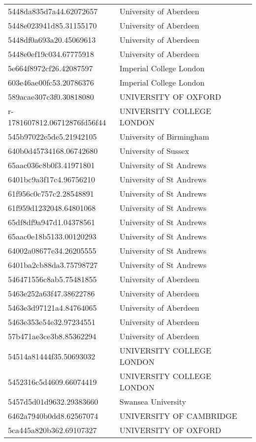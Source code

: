 \begin{tabular}{ll}
5448da835d7a44.62072657 & University of Aberdeen \\
5448e023941d85.31155170 & University of Aberdeen \\
5448df0a693a20.45069613 & University of Aberdeen \\
5448e0ef19c034.67775918 & University of Aberdeen \\
5e664f8972cf26.42087597 & Imperial College London \\
603e46ae00fc53.20786376 & Imperial College London \\
589acae307c3f0.30818080 & UNIVERSITY OF OXFORD \\
r-1781607812.06712876fd56f44 & UNIVERSITY COLLEGE LONDON \\
545b97022e5de5.21942105 & University of Birmingham \\
640b0d45734168.06742680 & University of Sussex \\
65aac036c8b0f3.41971801 & University of St Andrews \\
6401bc9a3f17c4.96756210 & University of St Andrews \\
61f956c0c757c2.28548891 & University of St Andrews \\
61f959d1232048.64801068 & University of St Andrews \\
65df8df9a947d1.04378561 & University of St Andrews \\
65aac0e18b5133.00120293 & University of St Andrews \\
64002a08677e34.26205555 & University of St Andrews \\
6401ba2cb88da3.75798727 & University of St Andrews \\
546471556c8ab5.75481855 & University of Aberdeen \\
5463e252a63f47.38622786 & University of Aberdeen \\
5463e3d97121a4.84764065 & University of Aberdeen \\
5463e353e54e32.97234551 & University of Aberdeen \\
57b471ae3ce3b8.85362294 & University of Aberdeen \\
54514a81444f35.50693032 & UNIVERSITY COLLEGE LONDON \\
5452316c5d4609.66074419 & UNIVERSITY COLLEGE LONDON \\
5457d5d01d9632.29383660 & Swansea University \\
6462a7940b0dd8.62567074 & UNIVERSITY OF CAMBRIDGE \\
5ca445a820b362.69107327 & UNIVERSITY OF OXFORD \\

\end{tabular}
